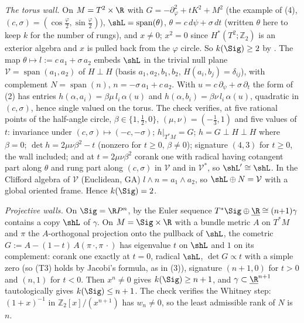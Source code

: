 \emph{The torus wall.} On $M = T^{2} \times \R$ with $G = -\partial_\varphi^{2} + t K^{2} + M^{2}$ (the example of (4), $(c, \sigma) = (\cos\frac\varphi2, \sin\frac\varphi2)$), $\shL = \operatorname{span}(\theta)$, $\theta = c\,d\psi + \sigma\,dt$ (written $\theta$ here to keep $k$ for the number of rungs), and $x \neq 0$; $x^{2} = 0$ since $H^*(T^2; \mathbb{Z}_2)$ is an exterior algebra and $x$ is pulled back from the $\varphi$ circle. So $k(\Sig) \geq 2$ by . The map $\theta \mapsto l := c\,a_{1} + \sigma\,a_{2}$ embeds $\shL$ in the trivial null plane $\mathcal V = \operatorname{span}(a_1, a_2)$ of $H \perp H$ (basis $a_1, a_2, b_1, b_2$, $H(a_i, b_j) = \delta_{ij}$), with complement $N = \operatorname{span}(n)$, $n = -\sigma\,a_1 + c\,a_2$. With $u = c\,\partial_\psi + \sigma\,\partial_t$ the form of (2) has entries $h(\alpha, a_i) = \beta\mu\, l_i\, \alpha(u)$ and $h(\alpha, b_i) = \beta\nu\, l_i\, \alpha(u)$, quadratic in $(c,\sigma)$, hence single valued on the torus. The check verifies, at five rational points of the half-angle circle, $\beta \in \{1, \frac12, 0\}$, $(\mu,\nu) = (-\frac13, 1)$ and five values of $t$: invariance under $(c,\sigma) \mapsto (-c,-\sigma)$; $h|_{T^*M} = G$; $h = G \perp H \perp H$ where $\beta = 0$; $\det h = 2\mu\nu\beta^{2} - t$ (nonzero for $t \geq 0$, $\beta \neq 0$); signature $(4,3)$ for $t \geq 0$, the wall included; and at $t = 2\mu\nu\beta^{2}$ corank one with radical having cotangent part along $\theta$ and rung part along $(c,\sigma)$ in $\mathcal V$ and in $\mathcal V^*$, so $\shL' \cong \shL$. In the Clifford algebra of $\mathcal V$ (Euclidean, GA) $l \wedge n = a_1 \wedge a_2$, so $\shL \oplus N = \mathcal V$ with a global oriented frame. Hence $k(\Sig) = 2$.

\emph{Projective walls.} On $\Sig = \R P^{n}$, by the Euler sequence $T^*\Sig \oplus \underline\R \cong (n{+}1)\gamma$ contains a copy $\shL$ of $\gamma$. On $M = \Sig \times \R$ with a bundle metric $A$ on $T^*M$ and $\pi$ the $A$-orthogonal projection onto the pullback of $\shL$, the cometric $G := A - (1 - t)\,A(\pi\,\cdot, \pi\,\cdot)$ has eigenvalue $t$ on $\shL$ and $1$ on its complement: corank one exactly at $t = 0$, radical $\shL$, $\det G \propto t$ with a simple zero (so (T3) holds by Jacobi's formula, as in (3)), signature $(n{+}1, 0)$ for $t > 0$ and $(n, 1)$ for $t < 0$. Then $x^{n} \neq 0$ gives $k(\Sig) \geq n + 1$, and $\gamma \subset \underline{\R}^{n+1}$ tautologically gives $k(\Sig) \leq n+1$. The check verifies the Whitney step: $(1+x)^{-1}$ in $\mathbb{Z}_2[x]/(x^{n+1})$ has $w_n \neq 0$, so the least admissible rank of $N$ is $n$.

